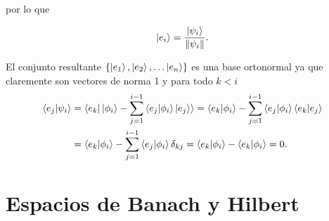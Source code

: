\documentclass[letterpaper]{book}
\begin{document}
\noindent por lo que

\[
\ket{e_i} = \frac{\ket{\psi_i}}{\Vert\psi_i\Vert}.
\]

El conjunto resultante \(\{\ket{e_1}, \ket{e_2},\dots \ket{e_n}\}\) es una base ortonormal ya que claremente son vectores de norma 1 y para todo \(k<i\)
\begin{align*}
\braket{e_j|\psi_i}&=\braket{e_k|\ket{\phi_i} - \sum_{j=1}^{i-1} \braket{e_j | \phi_i} \ket{e_j}}= \braket{e_k|\phi_i}-\sum_{j=1}^{i-1} \braket{e_j | \phi_i} \braket{e_k|e_j}\\
                   &=\braket{e_k|\phi_i}-\sum_{j=1}^{i-1} \braket{e_j | \phi_i} \delta_{kj}=\braket{e_k|\phi_i}-\braket{e_k | \phi_i}=0.
\end{align*}

\section{Espacios de Banach y Hilbert}
\end{document}
